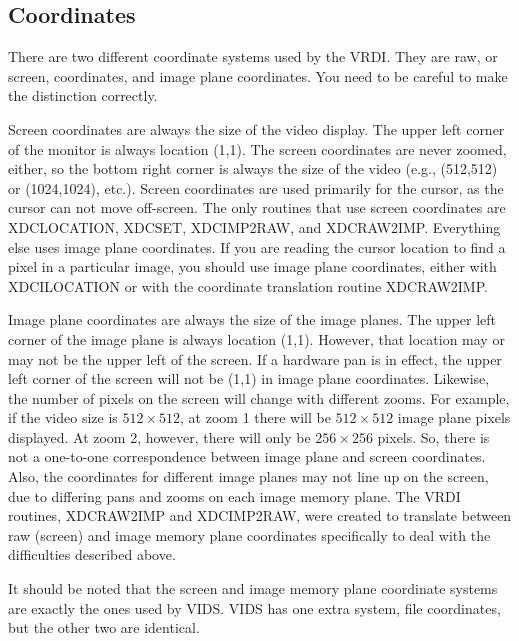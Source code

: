 \subsection{Coordinates}
\label{coordinates}
There are two different coordinate systems used by the VRDI.  They are
raw, or screen, coordinates, and image plane coordinates.  You need to
be careful to make the distinction correctly.

Screen coordinates are always the size of the video display.  The upper
left corner of the monitor is always location (1,1).  The screen
coordinates are never zoomed, either, so the bottom right corner is
always the size of the video (e.g., (512,512) or (1024,1024), etc.).
Screen coordinates are used primarily for the cursor, as the cursor
can not move off-screen.  The only routines that use screen coordinates
are XDCLOCATION, XDCSET, XDCIMP2RAW, and XDCRAW2IMP.  Everything
else uses image plane coordinates.  If you are reading the cursor location
to find a pixel in a particular image, you should use image plane
coordinates, either with XDCILOCATION or with the coordinate translation
routine XDCRAW2IMP.

Image plane coordinates are always the size of the image planes.  The
upper left corner of the image plane is always location (1,1).  However,
that location may or may not be the upper left of the screen.  If a
hardware pan is in effect, the upper left corner of the screen will not
be (1,1) in image plane coordinates.  Likewise, the number of pixels on
the screen will change with different zooms.  For example, if the video
size is $512 \times 512$, at zoom 1 there will be $512 \times 512$
image plane pixels
displayed.  At zoom 2, however, there will only be $256 \times 256$ pixels.
So, there is not a one-to-one correspondence between image plane and screen
coordinates.  Also, the coordinates for different image planes may not
line up on the screen, due to differing pans and zooms on each image
memory plane.  The VRDI routines, XDCRAW2IMP and XDCIMP2RAW, were
created to translate between raw (screen) and image memory plane
coordinates specifically to deal with the difficulties described above.

It should be noted that the screen and image memory plane coordinate
systems are exactly the ones used by VIDS.  VIDS has one extra system,
file coordinates, but the other two are identical.
\cleardoublepage
